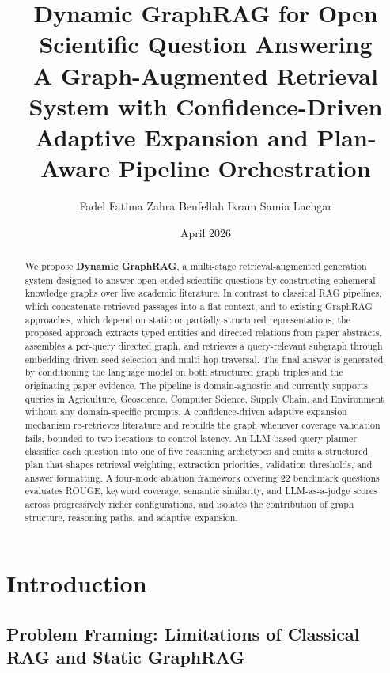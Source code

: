\documentclass[11pt,a4paper]{article}
\title{%
  \color{primary}\textbf{Dynamic GraphRAG for Open Scientific Question Answering}\\[0.5em]
  \large\color{softgray} A Graph-Augmented Retrieval System with Confidence-Driven\\
  Adaptive Expansion and Plan-Aware Pipeline Orchestration%
}
\author{Fadel Fatima Zahra \quad Benfellah Ikram \quad Samia Lachgar}
\date{April 2026}
\begin{document}
\maketitle
\thispagestyle{empty}

\begin{abstract}
\noindent
We propose \textbf{Dynamic GraphRAG}, a multi-stage retrieval-augmented
generation system designed to answer open-ended scientific questions by
constructing ephemeral knowledge graphs over live academic literature. In
contrast to classical RAG pipelines, which concatenate retrieved passages
into a flat context, and to existing GraphRAG approaches, which depend on
static or partially structured representations, the proposed approach
extracts typed entities and directed relations from paper abstracts,
assembles a per-query directed graph, and retrieves a query-relevant
subgraph through embedding-driven seed selection and multi-hop traversal.
The final answer is generated by conditioning the language model on both
structured graph triples and the originating paper evidence. The pipeline
is domain-agnostic and currently supports queries in Agriculture,
Geoscience, Computer Science, Supply Chain, and Environment without any
domain-specific prompts. A confidence-driven adaptive expansion mechanism
re-retrieves literature and rebuilds the graph whenever coverage validation
fails, bounded to two iterations to control latency. An LLM-based query
planner classifies each question into one of five reasoning archetypes and
emits a structured plan that shapes retrieval weighting, extraction
priorities, validation thresholds, and answer formatting. A four-mode
ablation framework covering 22 benchmark questions evaluates ROUGE, keyword
coverage, semantic similarity, and LLM-as-a-judge scores across
progressively richer configurations, and isolates the contribution of graph
structure, reasoning paths, and adaptive expansion.
\end{abstract}

\tableofcontents
\newpage

\section{Introduction}

\subsection{Problem Framing: Limitations of Classical RAG and Static GraphRAG}
\end{document}
